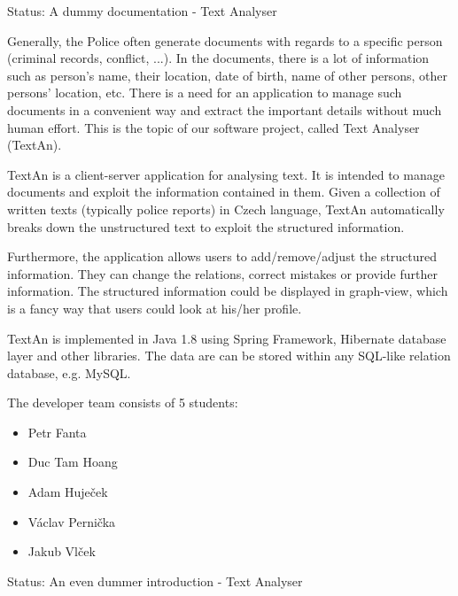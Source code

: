 Status: A dummy documentation - Text Analyser



Generally, the Police often generate documents with regards to a specific person (criminal records, conflict, ...). 
In the documents, there is a lot of information such as
person's name, their location, date of birth, name of other persons, other persons' location, etc.
There is a need for an application to manage such documents in a convenient way and extract the important details without much human effort.
This is the topic of our software project, called Text Analyser (TextAn).

TextAn is a client-server application for analysing text.
It is intended to manage documents and exploit the information contained in them.
Given a collection of written texts (typically police reports) in Czech language,
TextAn automatically breaks down the unstructured text to exploit the structured information. 

Furthermore, the application allows users to add/remove/adjust the structured information.
They can change the relations, correct mistakes or provide further information.
The structured information could be displayed in graph-view,
which is a fancy way that users could look at his/her profile. 

TextAn is implemented in Java 1.8 using Spring Framework, Hibernate database layer and other libraries.
The data are can be stored within any SQL-like relation database, e.g. MySQL.

The developer team consists of 5 students:

\begin{itemize}
\itemsep0em
\item Petr Fanta
\item Duc Tam Hoang
\item Adam Huječek
\item Václav Pernička
\item Jakub Vlček
\end{itemize}

Status: An even dummer introduction - Text Analyser

